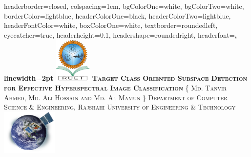 \documentclass[landscape,a0paper,fontscale=0.285]{baposter} %
\begin{document}
\begin{poster}
{
headerborder=closed, %
colspacing=1em, %
bgColorOne=white, %
bgColorTwo=white, %
borderColor=lightblue, %
headerColorOne=black, %
headerColorTwo=lightblue, %
headerFontColor=white, %
boxColorOne=white, %
textborder=roundedleft, %
eyecatcher=true, %
headerheight=0.1\textheight, %
headershape=roundedright, %
headerfont=\Large\bf\textsc, %
linewidth=2pt %
}
%
{\includegraphics[height=6em]{ruet.png}} %
{\bf\textsc{Target Class Oriented Subspace Detection for Effective Hyperspectral Image Classification}\vspace{0.1em}} %
{\textsc{\{ Md. Tanvir Ahmed, Md. Ali Hossain and Md. Al Mamun \} \hspace{12pt} Department of Computer Science \& Engineering, Rajshahi University of Engineering \& Technology}} %
{\includegraphics[height=6em]{sattelite.png}} %


\end{poster}
\end{document}
